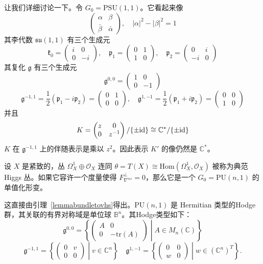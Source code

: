 让我们详细讨论一下。令 $G_0 = \mathrm{PSU}(1,1)$。它看起来像
\[ \begin{pmatrix} \alpha & \beta \\ \bar{\beta} & \bar{\alpha} \end{pmatrix}, \quad |\alpha|^2 - |\beta|^2 = 1 \]
其李代数 $\mathfrak{su}(1,1)$ 有三个生成元
\[ \mathfrak{k}_0 = \begin{pmatrix} i & 0 \\ 0 & -i \end{pmatrix}, \quad \mathfrak{p}_1 = \begin{pmatrix} 0 & 1 \\ 1 & 0 \end{pmatrix}, \quad \mathfrak{p}_2 = \begin{pmatrix} 0 & i \\ -i & 0 \end{pmatrix} \]
其复化 $\mathfrak{g}$ 有三个生成元
\[ \mathfrak{g}^{0,0} = \begin{pmatrix} 1 & 0 \\ 0 & -1 \end{pmatrix} \]
\[ \mathfrak{g}^{-1,1} = \frac{1}{2}(\mathfrak{p}_1 - i\mathfrak{p}_2) = \begin{pmatrix} 0 & 1 \\ 0 & 0 \end{pmatrix}, \quad \mathfrak{g}^{1,-1} = \frac{1}{2}(\mathfrak{p}_1 + i\mathfrak{p}_2) = \begin{pmatrix} 0 & 0 \\ 1 & 0 \end{pmatrix} \]
并且
\[ K = \begin{pmatrix} z & 0 \\ 0 & z^{-1} \end{pmatrix} / \{\pm \mathrm{id}\} \cong \mathbb{C}^* / \{\pm \mathrm{id}\} \]
$K$ 在 $\mathfrak{g}^{-1,1}$ 上的伴随表示是乘以 $z^2$。因此表示 $K'$ 的像仍然是 $\mathbb{C}^*$。

\begin{example}[典范 Higgs 丛]
设 $X$ 是紧致的，丛 $\Omega_X^1 \oplus \mathcal{O}_X$ 连同 $\theta = T(X) \cong \mathrm{Hom}(\Omega_X^1, \mathcal{O}_X)$ 被称为典范 Higgs 丛。如果它容许一个度量使得 $F_{\nabla^{ns}}^\perp = 0$，那么它是一个 $G_0 = \mathrm{PU}(n,1)$ 的单值化形变。
\end{example}

这直接由引理~\ref{lemmabundletovhs}得出。$\mathrm{PU}(n,1)$ 是 Hermitian 类型的Hodge群，其关联的有界对称域是单位球 $\mathbb{B}^n$。其Hodge类型如下：
\[ \mathfrak{g}^{0,0} = \left\{ \begin{pmatrix} A & 0 \\ 0 & -\mathrm{tr}(A) \end{pmatrix} \middle| A \in M_n(\mathbb{C}) \right\} \]
\[ \mathfrak{g}^{-1,1} = \left\{ \begin{pmatrix} 0 & v \\ 0 & 0 \end{pmatrix} \middle| v \in \mathbb{C}^n \right\} \quad \mathfrak{g}^{1,-1} = \left\{ \begin{pmatrix} 0 & 0 \\ w & 0 \end{pmatrix} \middle| w \in (\mathbb{C}^n)^T \right\}. \]

